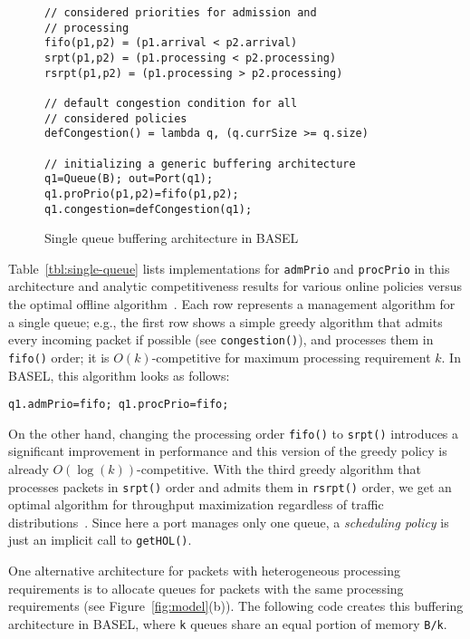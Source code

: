 \documentclass{article}
\newcommand{\barch}{BASEL}
\begin{document}
\newcommand{\ttfamsm}[1]{{\ttfamily\small #1}}

\begin{figure}[h]
\begin{lstlisting}[frame=tb,
	basicstyle=\ttfamily\small]
// considered priorities for admission and 
// processing
fifo(p1,p2) = (p1.arrival < p2.arrival)
srpt(p1,p2) = (p1.processing < p2.processing)
rsrpt(p1,p2) = (p1.processing > p2.processing)

// default congestion condition for all 
// considered policies
defCongestion() = lambda q, (q.currSize >= q.size)

// initializing a generic buffering architecture
q1=Queue(B); out=Port(q1);
q1.proPrio(p1,p2)=fifo(p1,p2);
q1.congestion=defCongestion(q1);
\end{lstlisting}
\vspace{-5pt}
\caption{Single queue buffering architecture in \barch{}}\label{list:inst}
\end{figure}


Table~\ref{tbl:single-queue} lists implementations for \lstinline|admPrio| and \lstinline|procPrio| in this architecture and analytic competitiveness results for various online policies versus the optimal offline algorithm~\cite{KeslassyKSS12,NikolenkoK15}.
Each row represents a management algorithm for a single queue; e.g., the first row shows a simple greedy algorithm that admits every incoming packet if possible (see \lstinline|congestion()|), and processes them in \lstinline|fifo()| order; it is $O(k)$-competitive for maximum processing requirement $k$. In \barch{}, this algorithm looks as follows:


\begin{lstlisting}[basicstyle=\ttfamily\footnotesize]
q1.admPrio=fifo; q1.procPrio=fifo;
\end{lstlisting}

\noindent
On the other hand, changing the processing order \lstinline|fifo()| to
\lstinline|srpt()| introduces a significant improvement in performance
and this version of the greedy policy is already $O(\log{(k)})$-competitive. 
With the third greedy algorithm that processes packets in \lstinline|srpt()| order and admits them in \lstinline|rsrpt()| order, we get an optimal algorithm for throughput maximization regardless of traffic distributions~\cite{KeslassyKSS12}. Since here a port manages only one queue, a \emph{scheduling policy} is just an implicit call to \lstinline|getHOL()|.

One alternative architecture for packets with heterogeneous processing
requirements is to allocate queues for packets with the same processing requirements (see Figure~\ref{fig:model}(b)). 
The following code creates this buffering architecture in \barch{},
where \lstinline|k| queues share an equal portion of memory \lstinline|B/k|.
\end{document}
